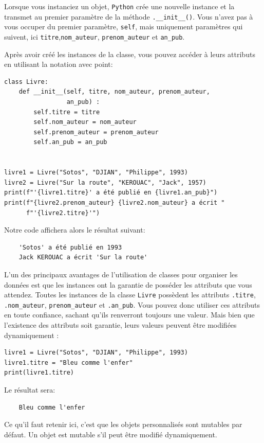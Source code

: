 \documentclass[a4paper,11pt]{book}
\begin{document}
Lorsque vous instanciez un objet, \texttt{Python} crée une nouvelle instance et la transmet au premier paramètre de la méthode \texttt{.\_\_init\_\_()}. Vous n'avez pas à vous occuper du premier paramètre, \texttt{self}, mais uniquement paramètres qui suivent, ici \texttt{titre},\texttt{nom\_auteur}, \texttt{prenom\_auteur} et \texttt{an\_pub}.
\medskip

Après avoir créé les instances de la classe, vous pouvez accéder à leurs attributs en utilisant la notation avec point:
\begin{lstlisting}[caption=Accès aux atributs d'instance]
class Livre:
    def __init__(self, titre, nom_auteur, prenom_auteur, 
                 an_pub) :
		self.titre = titre
		self.nom_auteur = nom_auteur
		self.prenom_auteur = prenom_auteur
		self.an_pub = an_pub


livre1 = Livre("Sotos", "DJIAN", "Philippe", 1993)
livre2 = Livre("Sur la route", "KEROUAC", "Jack", 1957)
print(f"'{livre1.titre}' a été publié en {livre1.an_pub}")
print(f"{livre2.prenom_auteur} {livre2.nom_auteur} a écrit "
      f"'{livre2.titre}'")
\end{lstlisting}
\medskip

Notre code affichera alors le résultat suivant:
\begin{verbatim}
    'Sotos' a été publié en 1993
    Jack KEROUAC a écrit 'Sur la route'
\end{verbatim}
\medskip

L'un des principaux avantages de l'utilisation de classes pour organiser les données est que les instances ont la garantie de posséder les attributs que vous attendez. Toutes les instances de la classe \texttt{Livre} possèdent les attributs \texttt{.titre}, \texttt{.nom\_auteur}, \texttt{prenom\_auteur} et \texttt{.an\_pub}. Vous pouvez donc utiliser ces attributs en toute confiance, sachant qu'ils renverront toujours une valeur. Mais bien que l'existence des attributs soit garantie, leurs valeurs peuvent être modifiées dynamiquement :
\begin{lstlisting}[caption=Modification dynamique des attributs]
livre1 = Livre("Sotos", "DJIAN", "Philippe", 1993)
livre1.titre = "Bleu comme l'enfer"
print(livre1.titre)
\end{lstlisting}
\medskip

Le résultat sera:
\begin{verbatim}
    Bleu comme l'enfer
\end{verbatim}
\medskip

Ce qu'il faut retenir ici, c'est que les objets personnalisés sont mutables par défaut. Un objet est mutable s'il peut être modifié dynamiquement.
\medskip
\end{document}
